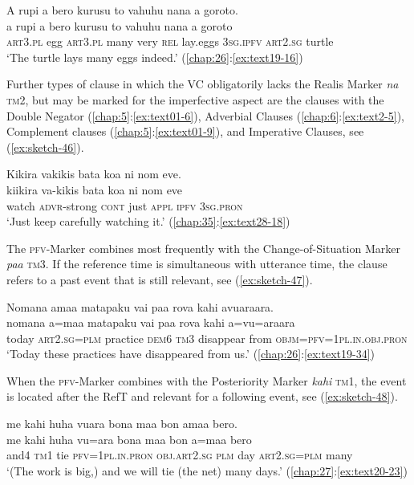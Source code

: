 \documentclass[output=paper]{langscibook}
\begin{document}
\newpage
\ea\label{ex:sketch-45}
    A rupi a bero kurusu to vahuhu nana a goroto.\\
    \gll a	rupi	a	bero	kurusu	to	vahuhu	nana	a	goroto\\
    \textsc{art}3.\textsc{pl}	egg	\textsc{art}3.\textsc{pl}	many	very	\textsc{rel}	lay.eggs	3\textsc{sg}.\textsc{ipfv}	\textsc{art}2.\textsc{sg}	turtle\\
    \glt `The turtle lays many eggs indeed.' (\ref{chap:26}:\ref{ex:text19-16})
\z

Further types of clause in which the VC obligatorily lacks the Realis Marker \textit{na} \textsc{tm}2, but may be marked for the imperfective aspect are the clauses with the Double Negator (\ref{chap:5}:\ref{ex:text01-6}), Adverbial Clauses (\ref{chap:6}:\ref{ex:text2-5}), Complement clauses (\ref{chap:5}:\ref{ex:text01-9}), and Imperative Clauses, see (\ref{ex:sketch-46}).


\ea\label{ex:sketch-46}
    Kikira vakikis bata koa ni nom eve.\\
    \gll kiikira	va-kikis	bata	koa	ni	nom	eve\\
    watch	\textsc{advr}-strong	\textsc{cont}	just	\textsc{appl}	\textsc{ipfv}	3\textsc{sg}.\textsc{pron}\\
    \glt `Just keep carefully watching it.' (\ref{chap:35}:\ref{ex:text28-18})
\z

The \textsc{pfv}-Marker combines most frequently with the Change-of-Situation Marker \textit{paa} \textsc{tm}3. If the reference time is simultaneous with  utterance time, the clause refers to a past event that is still relevant, see (\ref{ex:sketch-47}).

\ea\label{ex:sketch-47}
    Nomana amaa matapaku vai paa rova kahi avuaraara.\\
    \gll nomana	a=maa	matapaku	vai	paa	rova	kahi	a=vu=araara\\
    today	\textsc{art}2.\textsc{sg}=\textsc{plm}	practice	\textsc{dem}6	\textsc{tm}3	disappear	from	\textsc{objm}=\textsc{pfv}=1\textsc{pl}.\textsc{in}.\textsc{obj}.\textsc{pron}\\
    \glt `Today these practices have disappeared from us.' (\ref{chap:26}:\ref{ex:text19-34})
\z

When the \textsc{pfv}-Marker combines with the Posteriority Marker \textit{kahi} \textsc{tm}1, the event is located after the RefT and relevant for a following event, see (\ref{ex:sketch-48}).

\ea\label{ex:sketch-48}
    me kahi huha vuara bona maa bon amaa bero.\\
    \gll me	kahi	huha	vu=ara	bona	maa	bon	a=maa	bero\\
    and4	\textsc{tm}1	tie	\textsc{pfv}=1\textsc{pl}.\textsc{in}.\textsc{pron}	\textsc{obj}.\textsc{art}2.\textsc{sg}	\textsc{plm}	day	\textsc{art}2.\textsc{sg}=\textsc{plm}	many\\
    \glt `(The work is big,) and we will tie (the net) many days.' (\ref{chap:27}:\ref{ex:text20-23})
\z
\end{document}
